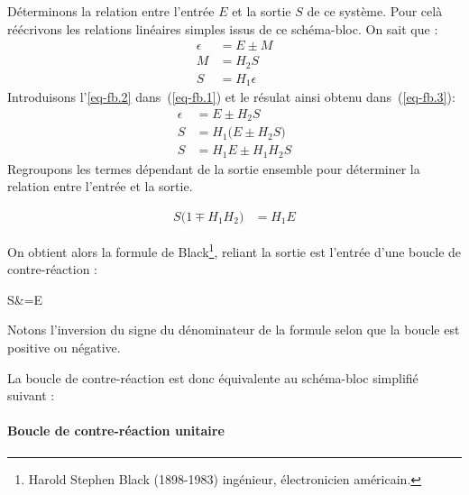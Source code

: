 Déterminons la relation entre l'entrée $E$ et la sortie $S$ de ce système.
Pour celà réécrivons les relations linéaires simples issus de ce schéma-bloc.
On sait que :
\begin{align}
    \epsilon&=E\pm M \label{eq-fb.1}\\
    M&=H_2S       \label{eq-fb.2}\\
    S&=H_1\epsilon \label{eq-fb.3}
\end{align}
Introduisons l'\cref{eq-fb.2} dans~(\ref{eq-fb.1}) et le résulat ainsi 
obtenu dans~(\ref{eq-fb.3}):
\begin{align*}
    \epsilon&=E\pm H_2S \\
     S&=H_1\big(E\pm H_2S\big) \\
     S&=H_1E\pm H_1H_2S
\end{align*}
Regroupons les termes dépendant de la sortie ensemble pour déterminer 
la relation entre l'entrée et la sortie.

\begin{align*}
    S\big(1\mp H_1H_2\big)&=H_1E 
\end{align*}

On obtient alors la formule de Black\footnote{
Harold Stephen Black (1898-1983) ingénieur, 
électronicien américain.}, 
reliant la sortie est l'entrée d'une boucle de contre-réaction :
\begin{bequation}
    S&=E
\end{bequation}

Notons l'inversion du signe du dénominateur de la formule 
selon que la boucle est positive ou négative.

La boucle de contre-réaction est donc équivalente au schéma-bloc 
simplifié suivant :
\begin{center}
\end{center}


\paragraph{Boucle de contre-réaction unitaire}

